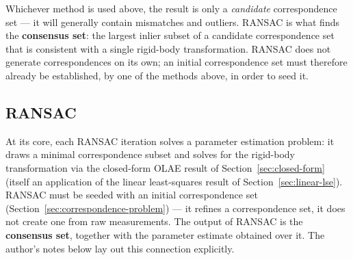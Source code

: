 \documentclass{article}
\begin{document}
Whichever method is used above, the result is only a \emph{candidate} correspondence set --- it will generally contain mismatches and outliers. RANSAC is what finds the \textbf{consensus set}: the largest inlier subset of a candidate correspondence set that is consistent with a single rigid-body transformation. RANSAC does not generate correspondences on its own; an initial correspondence set must therefore already be established, by one of the methods above, in order to seed it.

\subsection{RANSAC}
\label{sec:ransac-absolute-orientation}

At its core, each RANSAC iteration solves a parameter estimation problem: it draws a minimal correspondence subset and solves for the rigid-body transformation via the closed-form OLAE result of Section~\ref{sec:closed-form} (itself an application of the linear least-squares result of Section~\ref{sec:linear-lse}). RANSAC must be seeded with an initial correspondence set (Section~\ref{sec:correspondence-problem}) --- it refines a correspondence set, it does not create one from raw measurements. The output of RANSAC is the \textbf{consensus set}, together with the parameter estimate obtained over it. The author's notes below lay out this connection explicitly.
\end{document}
